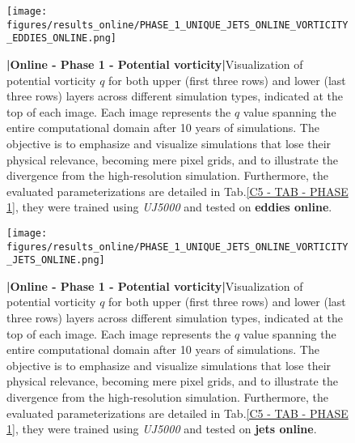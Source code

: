 %
%
\newpage

\begin{figure}[H]
    \centering
    \texttt{[image: figures/results\_online/PHASE\_1\_UNIQUE\_JETS\_ONLINE\_VORTICITY\_EDDIES\_ONLINE.png]}
    \caption{\textbf{|}\textcolor{section_color}{\textbf{Online - Phase 1 - Potential vorticity}}\textbf{|}Visualization of potential vorticity $q$ for both upper (first three rows) and lower (last three rows) layers across different simulation types, indicated at the top of each image. Each image represents the $q$ value spanning the entire computational domain after 10 years of simulations. The objective is to emphasize and visualize simulations that lose their physical relevance, becoming mere pixel grids, and to illustrate the divergence from the high-resolution simulation. Furthermore, the evaluated parameterizations are detailed in Tab.\ref{C5 - TAB - PHASE 1}, they were trained using \textit{UJ5000} and tested on \textbf{eddies online}.}
    \label{APP - ONLINE - PHASE 1 - VORTICITY -  JETS UNIQUE 5000 and EDDIES ONLINE}
\end{figure}

\newpage

\begin{figure}[H]
    \centering
    \texttt{[image: figures/results\_online/PHASE\_1\_UNIQUE\_JETS\_ONLINE\_VORTICITY\_JETS\_ONLINE.png]}
    \caption{\textbf{|}\textcolor{section_color}{\textbf{Online - Phase 1 - Potential vorticity}}\textbf{|}Visualization of potential vorticity $q$ for both upper (first three rows) and lower (last three rows) layers across different simulation types, indicated at the top of each image. Each image represents the $q$ value spanning the entire computational domain after 10 years of simulations. The objective is to emphasize and visualize simulations that lose their physical relevance, becoming mere pixel grids, and to illustrate the divergence from the high-resolution simulation. Furthermore, the evaluated parameterizations are detailed in Tab.\ref{C5 - TAB - PHASE 1}, they were trained using \textit{UJ5000} and tested on \textbf{jets online}.}
    \label{APP - ONLINE - PHASE 1 - VORTICITY -  JETS UNIQUE 5000 and JETS ONLINE}
\end{figure}













